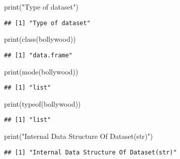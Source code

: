\documentclass[
]{article}
\newenvironment{Shaded}{\begin{snugshade}}{\end{snugshade}}
\newcommand{\FunctionTok}[1]{\textcolor[rgb]{0.00,0.00,0.00}{#1}}
\newcommand{\NormalTok}[1]{#1}
\newcommand{\StringTok}[1]{\textcolor[rgb]{0.31,0.60,0.02}{#1}}
\begin{document}
\begin{Shaded}
\begin{Highlighting}[]
\FunctionTok{print}\NormalTok{(}\StringTok{"Type of dataset"}\NormalTok{)}
\end{Highlighting}
\end{Shaded}

\begin{verbatim}
## [1] "Type of dataset"
\end{verbatim}

\begin{Shaded}
\begin{Highlighting}[]
\FunctionTok{print}\NormalTok{(}\FunctionTok{class}\NormalTok{(bollywood))}
\end{Highlighting}
\end{Shaded}

\begin{verbatim}
## [1] "data.frame"
\end{verbatim}

\begin{Shaded}
\begin{Highlighting}[]
\FunctionTok{print}\NormalTok{(}\FunctionTok{mode}\NormalTok{(bollywood))}
\end{Highlighting}
\end{Shaded}

\begin{verbatim}
## [1] "list"
\end{verbatim}

\begin{Shaded}
\begin{Highlighting}[]
\FunctionTok{print}\NormalTok{(}\FunctionTok{typeof}\NormalTok{(bollywood))}
\end{Highlighting}
\end{Shaded}

\begin{verbatim}
## [1] "list"
\end{verbatim}

\begin{Shaded}
\begin{Highlighting}[]
\FunctionTok{print}\NormalTok{(}\StringTok{"Internal Data Structure Of Dataset(str)"}\NormalTok{)}
\end{Highlighting}
\end{Shaded}

\begin{verbatim}
## [1] "Internal Data Structure Of Dataset(str)"
\end{verbatim}
\end{document}
